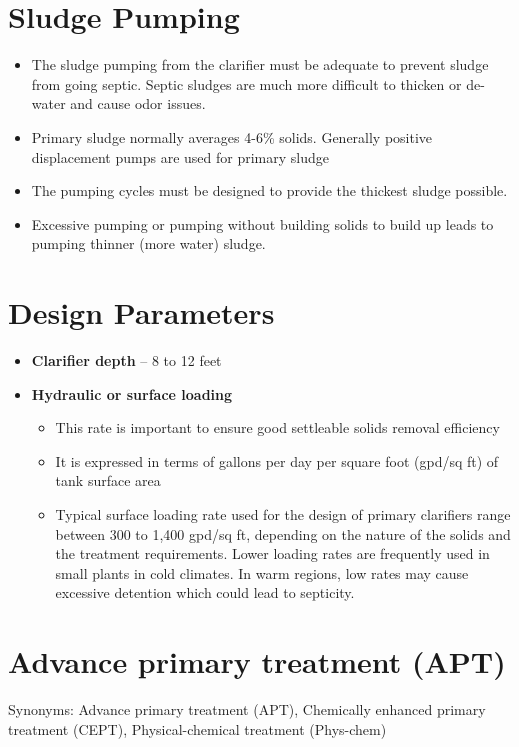 \clearpage
\section{Sludge Pumping}

	\begin{itemize}
		\item The sludge pumping from the clarifier must be adequate 			to prevent sludge from going septic. Septic sludges are much 			more difficult to thicken or de-water and cause odor issues. 
		\item Primary sludge normally averages 4-6\% solids. 
		Generally positive displacement pumps are used for primary 				sludge
		\item The pumping cycles must be designed to provide the 				thickest sludge possible.
		\item Excessive pumping or pumping without building solids to 			build up leads to pumping thinner (more water) sludge.
	\end{itemize}
\section{Design Parameters}
	\begin{itemize}
	\setlength\itemsep{1em}
		\item \textbf{Clarifier depth} – 8 to 12 feet
		\item \textbf{Hydraulic or surface loading}
			\begin{itemize}
			\item This rate is important to ensure good settleable 					solids removal efficiency
			\item It is expressed in terms of gallons per day per 					square foot (gpd/sq ft) of tank surface area
			\item Typical surface loading rate used for the design of 				primary clarifiers range between 300 to 1,400 gpd/sq ft, 				depending on the nature of the solids and the treatment 				requirements. Lower loading rates are frequently used in 				small plants in cold climates. In warm regions, low rates 				may cause excessive detention which could lead to 						septicity.
			\end{itemize}
	\end{itemize}
	
\section{Advance primary treatment (APT)}
Synonyms:  Advance primary treatment (APT), Chemically enhanced primary treatment (CEPT), Physical-chemical treatment (Phys-chem)
